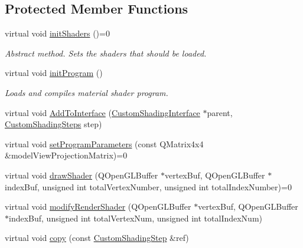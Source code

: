 \subsection*{Protected Member Functions}
\begin{DoxyCompactItemize}
\item 
\mbox{\label{class_geometry_engine_1_1_custom_shading_1_1_custom_shading_step_a7b76aa0521812638e519deb52785278a}} 
virtual void \mbox{\hyperlink{class_geometry_engine_1_1_custom_shading_1_1_custom_shading_step_a7b76aa0521812638e519deb52785278a}{init\+Shaders}} ()=0
\begin{DoxyCompactList}\small\item\em Abstract method. Sets the shaders that should be loaded. \end{DoxyCompactList}\item 
\mbox{\label{class_geometry_engine_1_1_custom_shading_1_1_custom_shading_step_a83d8fe4feb5a3372a7316f98b6b72d18}} 
virtual void \mbox{\hyperlink{class_geometry_engine_1_1_custom_shading_1_1_custom_shading_step_a83d8fe4feb5a3372a7316f98b6b72d18}{init\+Program}} ()
\begin{DoxyCompactList}\small\item\em Loads and compiles material shader program. \end{DoxyCompactList}\item 
virtual void \mbox{\hyperlink{class_geometry_engine_1_1_custom_shading_1_1_custom_shading_step_a02cecdebc31b4f94406f7032ebbad5fc}{Add\+To\+Interface}} (\mbox{\hyperlink{class_geometry_engine_1_1_custom_shading_1_1_custom_shading_interface}{Custom\+Shading\+Interface}} $\ast$parent, \mbox{\hyperlink{namespace_geometry_engine_1_1_custom_shading_a2dc236a5b567da5099069ce2b2be5609}{Custom\+Shading\+Steps}} step)
\item 
virtual void \mbox{\hyperlink{class_geometry_engine_1_1_custom_shading_1_1_custom_shading_step_a81d32702424be4eeb4ba3afc932571e7}{set\+Program\+Parameters}} (const Q\+Matrix4x4 \&model\+View\+Projection\+Matrix)=0
\item 
virtual void \mbox{\hyperlink{class_geometry_engine_1_1_custom_shading_1_1_custom_shading_step_a0aeb32e0833ce1b40946cd16c62167b9}{draw\+Shader}} (Q\+Open\+G\+L\+Buffer $\ast$vertex\+Buf, Q\+Open\+G\+L\+Buffer $\ast$index\+Buf, unsigned int total\+Vertex\+Number, unsigned int total\+Index\+Number)=0
\item 
virtual void \mbox{\hyperlink{class_geometry_engine_1_1_custom_shading_1_1_custom_shading_step_a7c0d840ea439baec320622473a409d49}{modify\+Render\+Shader}} (Q\+Open\+G\+L\+Buffer $\ast$vertex\+Buf, Q\+Open\+G\+L\+Buffer $\ast$index\+Buf, unsigned int total\+Vertex\+Num, unsigned int total\+Index\+Num)
\item 
virtual void \mbox{\hyperlink{class_geometry_engine_1_1_custom_shading_1_1_custom_shading_step_aa19da7a0827568a1f4741ba4f944cbdd}{copy}} (const \mbox{\hyperlink{class_geometry_engine_1_1_custom_shading_1_1_custom_shading_step}{Custom\+Shading\+Step}} \&ref)
\end{DoxyCompactItemize}
